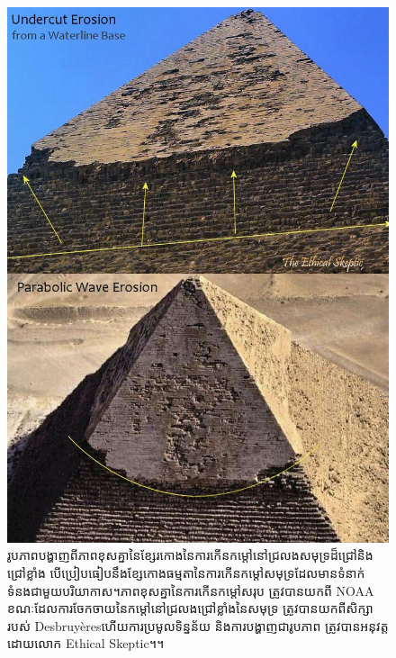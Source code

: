 \documentclass[10pt,twocolumn,letterpaper]{article}
\begin{document}
\begin{figure}[H]
\begin{center}
   \includegraphics[width=1\linewidth]{wave.jpg}
\end{center}
   \caption{រូបភាពបង្ហាញពីភាពខុសគ្នានៃខ្សែរកោងនៃការកើនកម្ដៅនៅជ្រលងសមុទ្រដ៏ជ្រៅនិងជ្រៅខ្លាំង បើប្រៀបធៀបនឹងខ្សែកោងធម្មតានៃការកើនកម្ដៅសមុទ្រដែលមានទំនាក់ទំនងជាមួយបរិយាកាស។ភាពខុសគ្នានៃការកើនកម្ដៅសរុប ត្រូវបានយកពី NOAA\cite{147}​ខណៈដែលការចែកចាយនៃកម្ដៅនៅជ្រលងជ្រៅខ្លាំងនៃសមុទ្រ ត្រូវបានយកពីសិក្សារបស់ Desbruyères\cite{132}​ហើយការប្រមូលទិន្នន័យ និងការបង្ហាញជារូបភាព ត្រូវបានអនុវត្តដោយលោក Ethical Skeptic។\cite{27}។}
\label{fig:19}
\label{fig:onecol}
\end{figure}
\end{document}
